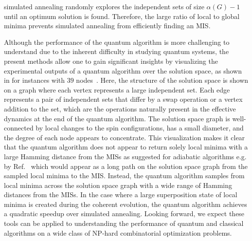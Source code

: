 \documentclass[review, onefignum, onetabnum]{siamart190516}
\begin{document}
simulated annealing randomly explores the independent sets of size $\alpha(G)-1$ until an optimum solution is found.
Therefore, the large ratio of local to global minima  prevents simulated annealing from efficiently finding an MIS.

Although the performance of the quantum algorithm is more challenging to understand due to the inherent difficulty in studying quantum systems, the present methods allow one 
to gain significant insights by visualizing the experimental outputs of a quantum algorithm over the solution space, as shown in  for instances with $39$ nodes~\cite{Ebadi2022}.
Here, the structure of the solution space is shown on a graph where each vertex represents a large independent set. Each edge represents a pair of independent sets that differ by a swap operation or a vertex addition to the set, which are the operations naturally present in the effective dynamics at the end of the quantum algorithm. 
The solution space graph is well-connected by local changes to the spin configurations, has a small diameter, and the degree of each node appears to concentrate. 
This visualization makes it clear that 
the quantum algorithm does not appear to return solely local minima with a large Hamming distance from the MISs as suggested for adiabatic algorithms e.g. by Ref.~\cite{altshuler2010}  which would appear as a long path on the solution space graph from the sampled local minima to the MIS. Instead, the quantum algorithm samples from local minima across the solution space graph with a wide range of Hamming distances from the MISs. In the case where a large superposition state of local minima is created during the coherent evolution, the quantum algorithm achieves a quadratic speedup over simulated annealing.
Looking forward, we expect these tools can be applied to understanding the performance of quantum and classical algorithms on a wide class of NP-hard combinatorial optimization problems.
\end{document}
